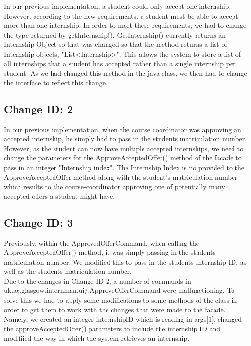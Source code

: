 \documentclass{l3deliverable}
\begin{document}
In our previous implementation, a student could only accept one internship. However, according to the new requirements, a student must be able to accept more than one internship. In order to meet these requirements, we had to change the type returned by getInternship(). GetInternship() currently returns an Internship Object so that was changed so that the method returns a list of Internship objects, "List<Internship>". This allows the system to store a list of all internships that a student has accepted rather than a single internship per student. As we had changed this method in the java class, we then had to change the interface to reflect this change.\\

\subsection{Change ID: 2}

In our previous implementation, when the course coordinator was approving an accepted internship, he simply had to pass in the students matriculation number. However, as the student can now have multiple accepted internships, we need to change the parameters for the ApproveAcceptedOffer() method of the facade to pass in an integer "Internship index". The Internship Index is no provided to the ApproveAcceptedOffer method along with the student's matriculation number which results to the course-coordinator approving one of potentially many accepted offers a student might have.

\subsection{Change ID: 3}

Previously, within the ApprovedOfferCommand, when calling the ApproveAcceptedOffer() method, it was simply passing in the students matriculation number. We modified this to pass in the students Internship ID, as well as the students matriculation number. \\
Due to the changes in Change ID 2, a number of commands in uk.ac.glasgow.internman.ui/.ApproveOfferCommand were malfunctioning. To solve this we had to apply some modifications to some methods of the class in order to get them to work with the changes that were made to the facade. Namely, we created an integer internshipID which is reading in args[1], changed the approveAcceptedOffer() parameters to include the internship ID and modifiied the way in which the system retrieves an internship.\\
\end{document}
